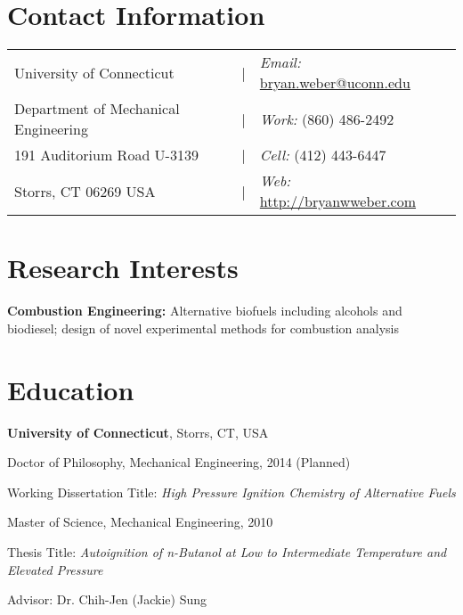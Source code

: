 \documentclass[margin,line]{res}
\newenvironment{list1}{
  \begin{list}{\ding{113}}{%
      \setlength{\itemsep}{0in}
      \setlength{\parsep}{0in} \setlength{\parskip}{0in}
      \setlength{\topsep}{0in} \setlength{\partopsep}{0in} 
      \setlength{\leftmargin}{0.17in}}}{\end{list}}
\begin{document}

\begin{resume}
\section{\sc Contact Information}
\vspace{.05in}
\begin{tabular}{@{}p{2.5in}p{0.1in}p{2in}}
University of Connecticut             &|& {\it Email:}  \href{mailto:bryan.weber@uconn.edu}{bryan.weber@uconn.edu}\\
Department of Mechanical Engineering  &|& {\it Work:} (860) 486-2492 \\         
191 Auditorium Road U-3139            &|& {\it Cell:} (412) 443-6447 \\            
Storrs, CT 06269 USA                  &|& {\it Web:} \url{http://bryanwweber.com} \\     
\end{tabular}


\section{\sc Research Interests}
{\bf Combustion Engineering:} Alternative biofuels including alcohols and biodiesel; design of novel experimental methods for combustion analysis

\section{\sc Education}
{\bf University of Connecticut}, Storrs, CT, USA
\begin{list1}
\item[] Doctor of Philosophy, Mechanical Engineering, 2014 (Planned)
\item[] Working Dissertation Title: \emph{High Pressure Ignition Chemistry of Alternative Fuels}
\end{list1}
\vspace*{0.1in}
\begin{list1}
\item[] Master of Science, Mechanical Engineering, 2010
\item[] Thesis Title: \emph{Autoignition of n-Butanol at Low to Intermediate Temperature and Elevated Pressure}
\end{list1}
\vspace*{0.1in}
\begin{list1}
\item[] Advisor: Dr. Chih-Jen (Jackie) Sung
\end{list1}


\end{resume}
\end{document}
